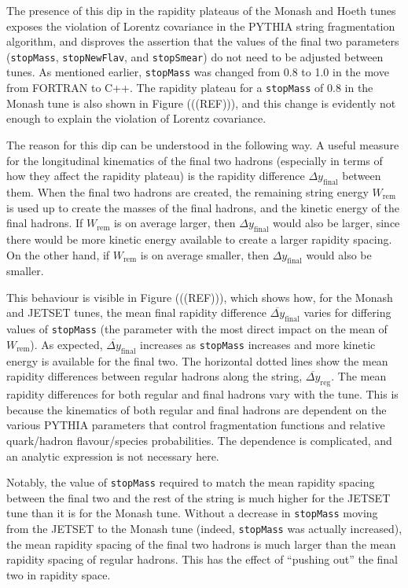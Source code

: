 \documentclass[12pt,a4paper]{report}
\begin{document}
The presence of this dip in the rapidity plateaus of the Monash and Hoeth tunes exposes the violation of Lorentz covariance in the PYTHIA string fragmentation algorithm, and disproves the assertion that the values of the final two parameters (\texttt{stopMass}, \texttt{stopNewFlav}, and \texttt{stopSmear}) do not need to be adjusted between tunes. As mentioned earlier, \texttt{stopMass} was changed from 0.8 to 1.0 in the move from FORTRAN to C++. The rapidity plateau for a \texttt{stopMass} of 0.8 in the Monash tune is also shown in Figure (((REF))), and this change is evidently not enough to explain the violation of Lorentz covariance.

The reason for this dip can be understood in the following way. A useful measure for the longitudinal kinematics of the final two hadrons (especially in terms of how they affect the rapidity plateau) is the rapidity difference $\Delta y_\text{final}$ between them. When the final two hadrons are created, the remaining string energy $W_\text{rem}$ is used up to create the masses of the final hadrons, and the kinetic energy of the final hadrons. If $W_\text{rem}$ is on average larger, then $\Delta y_\text{final}$ would also be larger, since there would be more kinetic energy available to create a larger rapidity spacing. On the other hand, if $W_\text{rem}$ is on average smaller, then $\Delta y_\text{final}$ would also be smaller.

This behaviour is visible in Figure (((REF))), which shows how, for the Monash and JETSET tunes, the mean final rapidity difference $\overline{\Delta y}_\text{final}$ varies for differing values of \texttt{stopMass} (the parameter with the most direct impact on the mean of $W_\text{rem}$). As expected, $\overline{\Delta y}_\text{final}$ increases as \texttt{stopMass} increases and more kinetic energy is available for the final two. The horizontal dotted lines show the mean rapidity differences between regular hadrons along the string, $\overline{\Delta y}_\text{reg}$. The mean rapidity differences for both regular and final hadrons vary with the tune. This is because the kinematics of both regular and final hadrons are dependent on the various PYTHIA parameters that control fragmentation functions and relative quark/hadron flavour/species probabilities. The dependence is complicated, and an analytic expression is not necessary here.

Notably, the value of \texttt{stopMass} required to match the mean rapidity spacing between the final two and the rest of the string is much higher for the JETSET tune than it is for the Monash tune. Without a decrease in \texttt{stopMass} moving from the JETSET to the Monash tune (indeed, \texttt{stopMass} was actually increased), the mean rapidity spacing of the final two hadrons is much larger than the mean rapidity spacing of regular hadrons. This has the effect of ``pushing out'' the final two in rapidity space.
\end{document}
